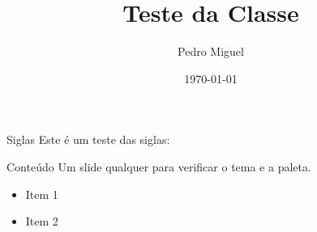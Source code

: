 \documentclass[Verde]{impaTeXSlide}
\title{Teste da Classe}
\author{Pedro Miguel}
\date{\today}
\begin{document}
\frame{\titlepage}

\begin{frame}{Siglas}
Este é um teste das siglas:

\IMPA

\IMPATech

\end{frame}

\begin{frame}{Conteúdo}
Um slide qualquer para verificar o tema e a paleta.

\begin{itemize}
    \item Item 1
    \item Item 2
\end{itemize}

\end{frame}
\end{document}
